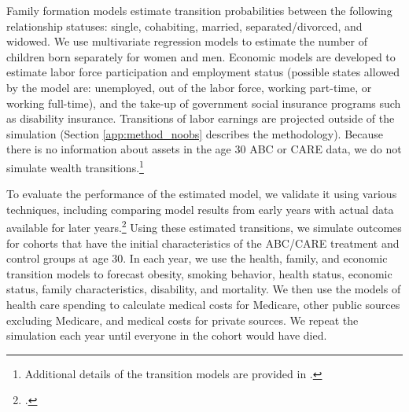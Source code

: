 \noindent Family formation models estimate transition probabilities between the following relationship statuses:  single, cohabiting, married, separated/divorced, and widowed. We use multivariate regression models to estimate the number of children born separately for women and men. Economic models are developed to estimate labor force participation and employment status (possible states allowed by the model are: unemployed, out of the labor force, working part-time, or working full-time), and the take-up of government social insurance programs such as disability insurance.
Transitions of labor earnings are projected outside of the simulation (Section \ref{app:method_noobs} describes the methodology).  Because there is no information about assets in the age 30 ABC or CARE data, we do not simulate wealth transitions.\footnote{Additional details of the transition models are provided in \citet{Goldman_etal_2015_Future-Adult-Model}.}

\noindent To evaluate the performance of the estimated model, we validate it using various techniques, including comparing model results from early years with actual data available for later years.\footnote{\citet{Goldman_etal_2015_Future-Adult-Model}.} Using these estimated transitions, we simulate outcomes for cohorts that have the initial characteristics of the ABC/CARE treatment and control groups at age 30. In each year, we use the health, family, and economic transition models to forecast obesity, smoking behavior, health status, economic status, family characteristics, disability, and mortality. We then use the models of health care spending to calculate medical costs for Medicare, other public sources excluding Medicare, and medical costs for private sources. We repeat the simulation each year until everyone in the cohort would have died.
